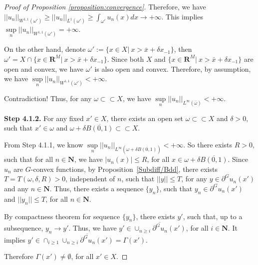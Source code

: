 \documentclass[a4paper, 11pt]{amsart}
\numberwithin{equation}{section}
\theoremstyle{plain}
\theoremstyle{definition}
\theoremstyle{remark}
\newcommand{\R}{\mathbf{R}}
\newcommand{\N}{\mathbf{N}}
\begin{document}
\begin{proof}[Proof of Proposition \ref{proposition:convergence}]
	Therefore, we have $||u_n||_{W^{1,1}(\omega')} \ge ||u_n||_{L^{1}(\omega')} \ge \int_{\omega'} u_n(x) dx \rightarrow +\infty$. This implies $\sup\limits_{n} ||u_n||_{W^{1,1}(\omega')} = +\infty$.
	
	On the other hand, denote $\omega' := \{x\in X|~ x>\bar{x}+\delta x_{-1}\}$, then $\omega' = X \cap \{x\in \R^M|~ x> \bar{x}+\delta x_{-1} \}$. Since both $X$ and $\{x\in \R^M|~ x> \bar{x}+\delta x_{-1} \}$ are open and convex, we have $\omega'$ is also open and convex. Therefore, by assumption, we have $\sup\limits_{n} ||u_n||_{W^{1,1}(\omega')} < +\infty.$ 
	
	Contradiction! Thus, for any $\omega \subset \subset X$, we have $\sup\limits_{n}||u_n||_{L^{\infty}(\bar{\omega})}<+\infty$.
	
	{\bf Step 4.1.2.} For any fixed $x'\in X$, there exists an open set $\omega \subset \subset X$ and $\delta>0$, such that $x'\in \omega$ and $\omega + \delta \overline{B(0,1)} \subset \subset X$.
	
	From Step 4.1.1, we know  $\sup\limits_{n}||u_n||_{L^{\infty}(\omega + \delta \overline{B(0,1)})} < +\infty$. 
	So there exists $R>0$, such that for all $n\in \N$, we have $|u_n(x)|\le R$, for all $x \in \omega + \delta \overline{B(0,1)}$. Since $u_n$ are $G$-convex functions, by Proposition~\ref{Subdiff/Bdd}, there exists $T = T(\omega, \delta, R) >0$, independent of $n$, such that $||y||\le T$, for any $y \in \partial^G u_n(x')$ and any $n\in \N$. Thus, there exists a sequence $\{ y_n \}$, such that $y_n \in \partial^G u_n(x')$ and $||y_n||\le T$, for all $n\in \N$.
	
	By compactness theorem for sequence $\{ y_n \}$,  there exists $y'$, such that, up to a subsequence, $y_n \rightarrow y'$. Thus, we have $y' \in \overline{\cup_{n\ge i}\partial^G u_n(x')}$, for all $i\in \N$. It implies $y' \in \cap_{i\ge 1} \overline{\cup_{n\ge i}\partial^G u_n(x')} = \Gamma (x')$. 
	
	Therefore $\Gamma(x') \neq \emptyset$, for all $x' \in X$.\medskip
	
	

\end{proof}
\end{document}
